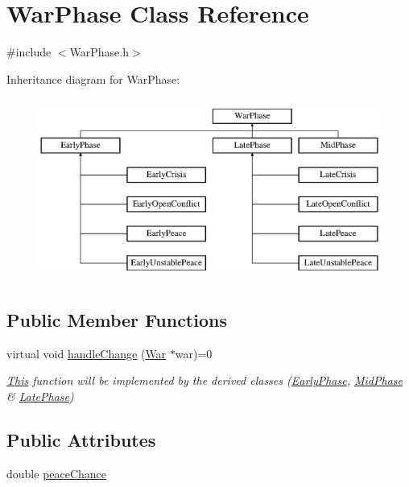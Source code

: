\hypertarget{class_war_phase}{}\section{War\+Phase Class Reference}
\label{class_war_phase}


{\ttfamily \#include $<$War\+Phase.\+h$>$}

Inheritance diagram for War\+Phase\+:\begin{figure}[H]
\begin{center}
\leavevmode
\includegraphics[height=6.000000cm]{class_war_phase}
\end{center}
\end{figure}
\subsection*{Public Member Functions}
\begin{DoxyCompactItemize}
\item 
virtual void \mbox{\hyperlink{class_war_phase_a258e9480c7b3dcbdebdf86863659f1e5}{handle\+Change}} (\mbox{\hyperlink{class_war}{War}} $\ast$war)=0
\begin{DoxyCompactList}\small\item\em \mbox{\hyperlink{class_this}{This}} function will be implemented by the derived classes (\mbox{\hyperlink{class_early_phase}{Early\+Phase}}, \mbox{\hyperlink{class_mid_phase}{Mid\+Phase}} \& \mbox{\hyperlink{class_late_phase}{Late\+Phase}}) \end{DoxyCompactList}\end{DoxyCompactItemize}
\subsection*{Public Attributes}
\begin{DoxyCompactItemize}
\item 
double \mbox{\hyperlink{class_war_phase_aa476ee98bb8f92df4d2e2f5b2ce4abca}{peace\+Chance}}
\end{DoxyCompactItemize}


